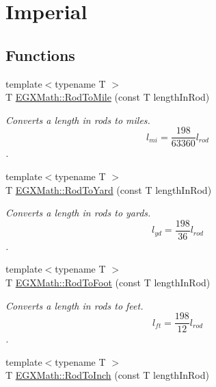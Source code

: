 \hypertarget{group___e_g_x_math-_conversions-_length_conversions-_imperial-_rod-_imperial}{}\section{Imperial}
\label{group___e_g_x_math-_conversions-_length_conversions-_imperial-_rod-_imperial}
\subsection*{Functions}
\begin{DoxyCompactItemize}
\item 
{\footnotesize template$<$typename T $>$ }\\T \mbox{\hyperlink{group___e_g_x_math-_conversions-_length_conversions-_imperial-_rod-_imperial_ga0ef0f9142bc6954af0961dabcf231abe}{E\+G\+X\+Math\+::\+Rod\+To\+Mile}} (const T length\+In\+Rod)
\begin{DoxyCompactList}\small\item\em Converts a length in rods to miles. \[ l_{mi}=\frac{198}{63360} l_{rod} \]. \end{DoxyCompactList}\item 
{\footnotesize template$<$typename T $>$ }\\T \mbox{\hyperlink{group___e_g_x_math-_conversions-_length_conversions-_imperial-_rod-_imperial_gaf9c279c2819bf2c950dcde7a67849bf6}{E\+G\+X\+Math\+::\+Rod\+To\+Yard}} (const T length\+In\+Rod)
\begin{DoxyCompactList}\small\item\em Converts a length in rods to yards. \[ l_{yd}= \frac{198}{36} l_{rod} \]. \end{DoxyCompactList}\item 
{\footnotesize template$<$typename T $>$ }\\T \mbox{\hyperlink{group___e_g_x_math-_conversions-_length_conversions-_imperial-_rod-_imperial_ga5d9948f5cfc97d94698be96955a9df7f}{E\+G\+X\+Math\+::\+Rod\+To\+Foot}} (const T length\+In\+Rod)
\begin{DoxyCompactList}\small\item\em Converts a length in rods to feet. \[ l_{ft}= \frac{198}{12} l_{rod} \]. \end{DoxyCompactList}\item 
{\footnotesize template$<$typename T $>$ }\\T \mbox{\hyperlink{group___e_g_x_math-_conversions-_length_conversions-_imperial-_rod-_imperial_gaa49be09f9d06ac2d8a5e0c3079a8ce5d}{E\+G\+X\+Math\+::\+Rod\+To\+Inch}} (const T length\+In\+Rod)

\end{DoxyCompactItemize}
